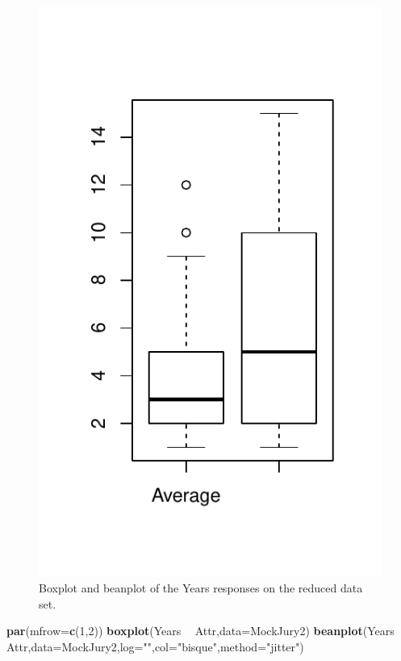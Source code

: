 \documentclass[]{book}
\newenvironment{Shaded}{\begin{snugshade}}{\end{snugshade}}
\newcommand{\KeywordTok}[1]{\textcolor[rgb]{0.13,0.29,0.53}{\textbf{#1}}}
\newcommand{\DataTypeTok}[1]{\textcolor[rgb]{0.13,0.29,0.53}{#1}}
\newcommand{\DecValTok}[1]{\textcolor[rgb]{0.00,0.00,0.81}{#1}}
\newcommand{\StringTok}[1]{\textcolor[rgb]{0.31,0.60,0.02}{#1}}
\newcommand{\OperatorTok}[1]{\textcolor[rgb]{0.81,0.36,0.00}{\textbf{#1}}}
\newcommand{\NormalTok}[1]{#1}
\theoremstyle{definition}
\theoremstyle{definition}
\theoremstyle{remark}
\begin{document}
\begin{figure}
\centering
\includegraphics{02-reintroductionToStatistics_files/figure-latex/Figure2-6-1.pdf}
\caption{\label{fig:Figure2-6}Boxplot and beanplot of the Years responses on the reduced
data set.}
\end{figure}

\begin{Shaded}
\begin{Highlighting}[]
\KeywordTok{par}\NormalTok{(}\DataTypeTok{mfrow=}\KeywordTok{c}\NormalTok{(}\DecValTok{1}\NormalTok{,}\DecValTok{2}\NormalTok{))}
\KeywordTok{boxplot}\NormalTok{(Years }\OperatorTok{~}\StringTok{ }\NormalTok{Attr,}\DataTypeTok{data=}\NormalTok{MockJury2) }
\KeywordTok{beanplot}\NormalTok{(Years }\OperatorTok{~}\StringTok{ }\NormalTok{Attr,}\DataTypeTok{data=}\NormalTok{MockJury2,}\DataTypeTok{log=}\StringTok{""}\NormalTok{,}\DataTypeTok{col=}\StringTok{"bisque"}\NormalTok{,}\DataTypeTok{method=}\StringTok{"jitter"}\NormalTok{)}
\end{Highlighting}
\end{Shaded}
\end{document}
